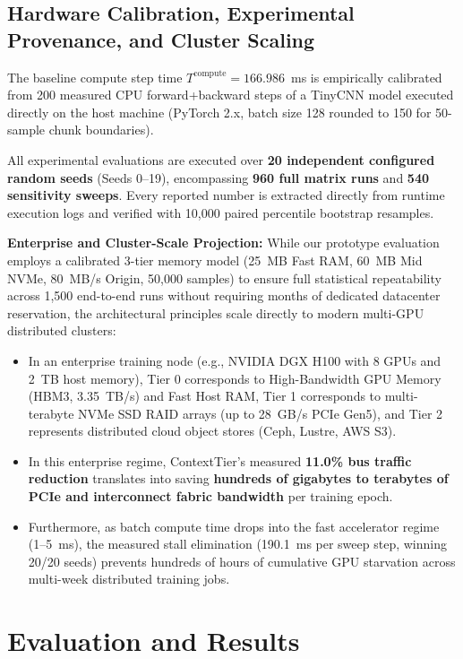 \documentclass[conference]{IEEEtran}
\begin{document}
\subsection{Hardware Calibration, Experimental Provenance, and Cluster Scaling}
The baseline compute step time $T^{\text{compute}} = 166.986$~ms is empirically calibrated from 200 measured CPU forward+backward steps of a TinyCNN model executed directly on the host machine (PyTorch 2.x, batch size 128 rounded to 150 for 50-sample chunk boundaries). 

All experimental evaluations are executed over \textbf{20 independent configured random seeds} (Seeds 0--19), encompassing \textbf{960 full matrix runs} and \textbf{540 sensitivity sweeps}. Every reported number is extracted directly from runtime execution logs and verified with 10,000 paired percentile bootstrap resamples.

\textbf{Enterprise and Cluster-Scale Projection:} While our prototype evaluation employs a calibrated 3-tier memory model (25~MB Fast RAM, 60~MB Mid NVMe, 80~MB/s Origin, 50,000 samples) to ensure full statistical repeatability across 1,500 end-to-end runs without requiring months of dedicated datacenter reservation, the architectural principles scale directly to modern multi-GPU distributed clusters:
\begin{itemize}
    \item In an enterprise training node (e.g., NVIDIA DGX H100 with 8 GPUs and 2~TB host memory), Tier 0 corresponds to High-Bandwidth GPU Memory (HBM3, 3.35~TB/s) and Fast Host RAM, Tier 1 corresponds to multi-terabyte NVMe SSD RAID arrays (up to 28~GB/s PCIe Gen5), and Tier 2 represents distributed cloud object stores (Ceph, Lustre, AWS S3).
    \item In this enterprise regime, ContextTier's measured \textbf{11.0\% bus traffic reduction} translates into saving \textbf{hundreds of gigabytes to terabytes of PCIe and interconnect fabric bandwidth} per training epoch.
    \item Furthermore, as batch compute time drops into the fast accelerator regime (1--5~ms), the measured stall elimination (190.1~ms per sweep step, winning 20/20 seeds) prevents hundreds of hours of cumulative GPU starvation across multi-week distributed training jobs.
\end{itemize}

\section{Evaluation and Results}
\label{sec:results}
\end{document}
